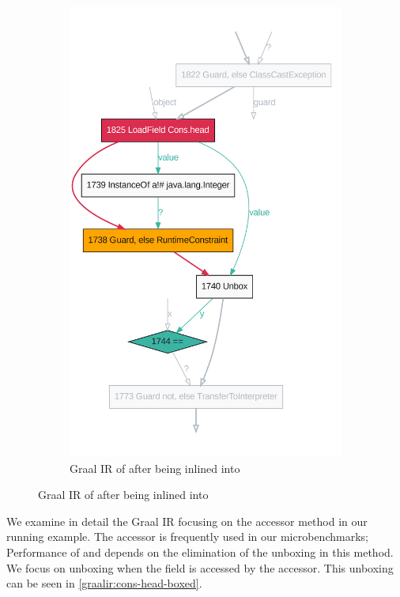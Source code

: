 \begin{figure}[!htb]
\begin{subfigure}[b]{0.45\textwidth}
		\includegraphics[width=\textwidth]{figures/dot/List.contains.boxed.TruffleTier.png}
		\caption{Graal IR of  after being inlined into }
		\label{graalir:cons-contains-head-focus-boxed}
	\end{subfigure}
	\hfill
\end{figure}

We examine in detail the Graal IR focusing on the  accessor method in our  running example.
The accessor is frequently used in our  microbenchmarks; Performance of  and  depends on the elimination of the unboxing in this method.
We focus on unboxing when the  field is accessed by the  accessor.
This unboxing can be seen in \ref{graalir:cons-head-boxed}.

